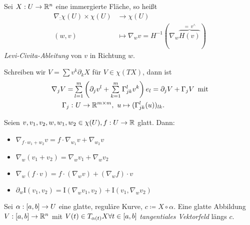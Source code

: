 \documentclass{cheat-sheet}
\newcommand{\FFI}{\mathrm{I}} %
\begin{document}
\begin{defn}
  Sei $X : U \to \mathbb{R}^n$ eine immergierte Fläche, so heißt
  \begin{align*}
    \nabla_ : \chi(U) \times \chi(U) &\to \chi(U) \\[-12pt]
    (w, v) &\mapsto \nabla_w v = H^{-1}(\nabla_w \overbrace{H(v)}^{=\,v^\wedge})
  \end{align*}
  \emph{Levi-Civita-Ableitung} von $v$ in Richtung $w$.
\end{defn}

\begin{bem}
  Schreiben wir $V = \sum v^k \partial_k X$ für $V \in \chi(TX)$, dann ist
  \begin{align*}
    \nabla_j V =& \sum_{l=1}^m \left( \partial_j v^l + \sum_{k=1}^m \Gamma_{jk}^l v^k \right) e_l = \partial_j V + \Gamma_j V \enspace \text{mit}\\
    \Gamma_j :& \,\, U \to \R^{m \times m}, \,\, u \mapsto (\Gamma_{jk}^l(u))_{lk}.
  \end{align*}
\end{bem}

\begin{satz}
  Seien $v, v_1, v_2, w, w_1, w_2 \in \chi(U), f : U \to \mathbb{R}$ glatt. Dann:
  \begin{itemize}
    \item $\nabla_{f \cdot w_1 + w_2} v = f \cdot \nabla_{w_1} v + \nabla_{w_2} v$ 
    \item $\nabla_w (v_1 + v_2) = \nabla_w v_1 + \nabla_w v_2$ 
    \item $\nabla_w (f \cdot v) = f \cdot (\nabla_w v) + (\nabla_w f) \cdot v$ 
    \item $\partial_w \FFI(v_1, v_2) = \FFI(\nabla_w v_1, v_2) + \FFI(v_1, \nabla_w v_2)$ 
  \end{itemize}
\end{satz}



\begin{defn}
  Sei $\alpha : \left[ a, b \right] \to U$ eine glatte, reguläre Kurve, $c \coloneqq X \circ \alpha$. Eine glatte Abbildung $V : \left[ a, b \right] \to \mathbb{R}^n$ mit $V(t) \in T_{\alpha(t)} X \forall t \in \left[ a, b \right]$ \emph{tangentiales Vektorfeld} längs $c$.
\end{defn}
\end{document}
